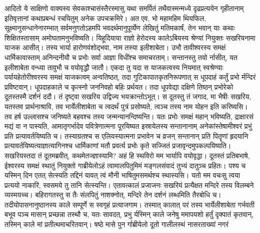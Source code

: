 \adhyAya
{}
\vakya आदितो ये साक्षिणो वाक्यस्य सेवकाश्चासंस्तैरस्मासु यथा समर्पितं
\vakya तथैवास्मन्मध्ये दृढप्रत्ययेन गृहीतानाम् इतिवृत्तानां कथाप्रबन्धं रचयितुम् अनेक उपचक्रमिरे।
\vakya अत एव, भो महामहिम थियफिल, सूक्ष्मानुसन्धानेनारम्भात् सर्वमनुगतोऽहमपि भवदर्थमानुपूर्व्येण लेखितुं मतिमकार्षं,
\vakya तेन भवान् याः कथाः शिक्षितस्तासाम् अमोघतामनुभविष्यति।
\vakya यिहूदियाया राज्ञो हेरोदस्य कालेऽबियस्य श्रेण्यां नियुक्तः सखरियनामा याजक आसीत्। तस्य भार्या हारोणवंशोद्भवा, नाम तस्या इलीशाबेता।
\vakya उभौ तावीश्वरस्य समक्षं धार्मिकावास्ताम् अनिन्दनीयौ च प्रभोः सर्वा आज्ञा विधींश्च समाचरताम्।
\vakya सन्तानस्तु तयो र्नासीत्, यत इलीशाबेता वन्ध्या तावुभौ च वयोवृद्धौ जातौ।
\vakya एकदा तु यदा स याजकत्वस्य नियमात् स्वश्रेण्याः पर्यायहेतोरीश्वरस्य समक्षं याजकत्वम् अन्वतिष्ठत्,
\vakya तदा गुटिकापातकृतनिरूपणात् स धूपदाहं कर्तुं प्रभो र्मन्दिरं प्रविष्टवान्।
\vakya धूपदाहकाले च कृत्स्नो जननिवहो बहिः प्रर्थयत।
\vakya तदा धूपवेद्या दक्षिणे तिष्ठन् प्रभोरेको दूतस्तस्मै दर्शनं ददौ।
\vakya तं दृष्ट्वा सखरिय उद्विज्य भयक्रान्तोऽभूत्।
\vakya स दूतस्तु तं जगाद, मा भैषीः सखरिय, यतस्तव प्रार्थनाश्रावि, तव भार्येलीशाबेता च त्वदर्थं पुत्रं प्रसोष्यते, त्वञ्च तस्य नाम योहन इति करिष्यसि।
\vakya तव हर्ष उल्लासश्च जनिष्यते बहवश्च तस्य जन्मन्यानन्दिष्यन्ति।
\vakya यतः प्रभोः समक्षं महान् भविष्यति, द्राक्षारसं मद्यं वा न पास्यति,
\vakya आमातृगर्भादेव पवित्रेणात्मना पूरयिष्यत इस्रायेलस्य सन्तानानाम् अनेकांस्तेषामीश्वरं प्रभुं प्रति प्रत्यावर्तयिष्यति च।
\vakya तस्याग्रतश्च स एलियस्यात्मना प्रभावेन च व्रजन् सन्तानान् प्रति पितॄणां हृदयानि प्रत्यावर्तयिष्यत्याज्ञात्यागिनश्च धार्मिकाणां मतौ प्रवर्त्य प्रभोः कृते सज्जितं प्रजावृन्दमुपकल्पयिष्यति।
\vakya सखरियस्तदा तं दूतमब्रवीत्, कथमेतज्ज्ञास्यामि? अहं हि स्थविरो मम भार्यापि वयोवृद्धा।
\vakya दूतस्तं प्रतिबभाषे, ईश्वरस्य समक्षं स्थातुं नियुक्तो गाब्रीयेलोऽहं त्वामालपितुमिमं मङ्गलसंवादं तुभ्यं दातुञ्च प्रहितः।
\vakya पश्य च यस्मिन् दिन एतत् सेत्स्यति तद्दिनं यावत् त्वं मौनी भाषितुमसमर्थश्च स्थास्यसि। यतो मम वचःसु त्वया प्रत्ययो नाकारि, स्वसमये तु तानि सेत्स्यन्ति।
\vakya एतावत्कालं प्रजाजनः सखरियं प्रत्यैक्षत मन्दिरे तस्य विलम्बने व्यस्मयच्च।
\vakya बहिरागतस्तु स तैः संलपितुं नाशक्नोत्, मन्दिरे तेन दर्शनं लब्धमिति तैरबोधि च।
\vakya तदीयोपासनानुष्ठानस्य काले सम्पूर्णे स स्वगृहं प्रत्याजगाम।
\vakya तस्मात् कालात् परं तस्य भार्येलीशाबेता गर्भवती बभूव पञ्च मासान् प्रच्छन्ना तस्थौ च,
\vakya यतः सावदत्, प्रभु र्यस्मिन् काले जनेषु ममापयशो हर्तुं दृक्पातं कृतवान्, तस्मिन् काले मां प्रतीत्थमाचरितवान्।
\vakya षष्ठे मासे पुन र्गाब्रीयेलो दूतो गालीलस्थं नासरताख्यां नगरं
